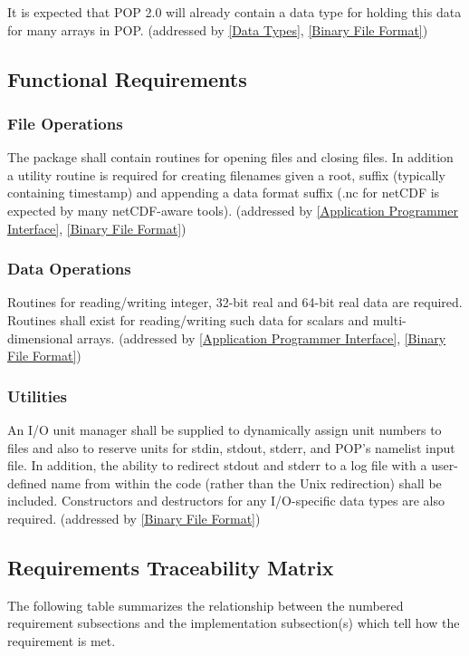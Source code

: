 \documentclass[11pt]{article}
\begin{document}
\noindent
It is expected that POP 2.0 will already contain a data type
for holding this data for many arrays in POP.
(addressed by \ref{Data Types}, \ref{Binary File Format})

\subsection{Functional Requirements}

\subsubsection{File Operations}
\label{File Operations}
The package shall contain routines for opening files and closing files.
In addition a utility routine is required for creating filenames
given a root, suffix (typically containing timestamp)
and appending a data format suffix
(.nc for netCDF is expected by many netCDF-aware tools).
(addressed by \ref{Application Programmer Interface}, \ref{Binary File Format})

\subsubsection{Data Operations}
\label{Data Operations}
Routines for reading/writing integer, 32-bit real and 64-bit
real data are required.
Routines shall exist for reading/writing such data for scalars
and multi-dimensional arrays.
(addressed by \ref{Application Programmer Interface}, \ref{Binary File Format})

\subsubsection{Utilities}
\label{Utilities}
An I/O unit manager shall be supplied to dynamically assign
unit numbers to files and also to reserve units for stdin,
stdout, stderr, and POP's namelist input file.
In addition, the ability to redirect stdout and stderr to a
log file with a user-defined name from within the code
(rather than the Unix redirection) shall be included.
Constructors and destructors for any I/O-specific data
types are also required.
(addressed by \ref{Binary File Format})

\subsection{Requirements Traceability Matrix}
The following table summarizes the relationship between the
numbered requirement subsections and the implementation
subsection(s) which tell how the requirement is met.
\end{document}
